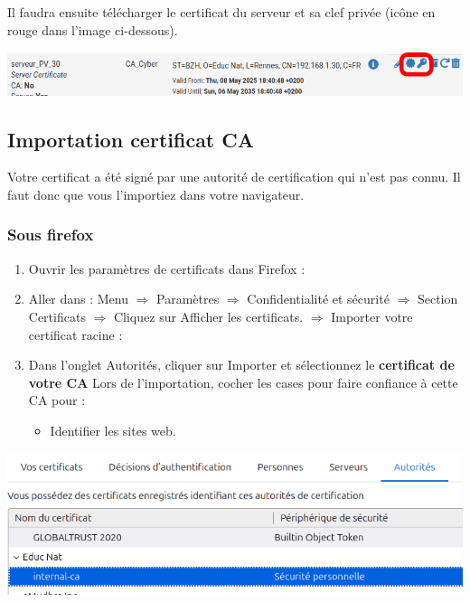 \documentclass[french, 12pt]{article}%
\newcommand{\itemE}{\item[$\bullet$]}
\begin{document}
Il faudra ensuite télécharger le certificat du serveur et sa clef privée (icône en rouge dans l'image ci-dessous).
\begin{center}
\includegraphics[scale=0.5]{./ressource/certif_serveur}
\end{center}





\subsection{Importation certificat CA }
\label{lbl_importCA}
Votre certificat a été signé par une autorité de certification qui n'est pas connu. Il faut donc que vous l'importiez dans votre navigateur.

\subsubsection{Sous firefox}
\begin{enumerate}
\item Ouvrir les paramètres de certificats dans Firefox :
\item Aller dans :
Menu $\Rightarrow$ Paramètres  $\Rightarrow$  Confidentialité et sécurité  $\Rightarrow$ Section Certificats  $\Rightarrow$  Cliquez sur Afficher les certificats.  $\Rightarrow$ Importer votre certificat racine :
\item Dans l'onglet Autorités, cliquer sur Importer et sélectionnez le  \textbf{certificat de votre CA}
Lors de l'importation, cocher les cases pour faire confiance à cette CA pour :
\begin{itemize}
\itemE Identifier les sites web.
\end{itemize}
\end{enumerate}

\begin{center}
\includegraphics[scale=0.7]{./ressource/newCA}
\end{center}
\end{document}
